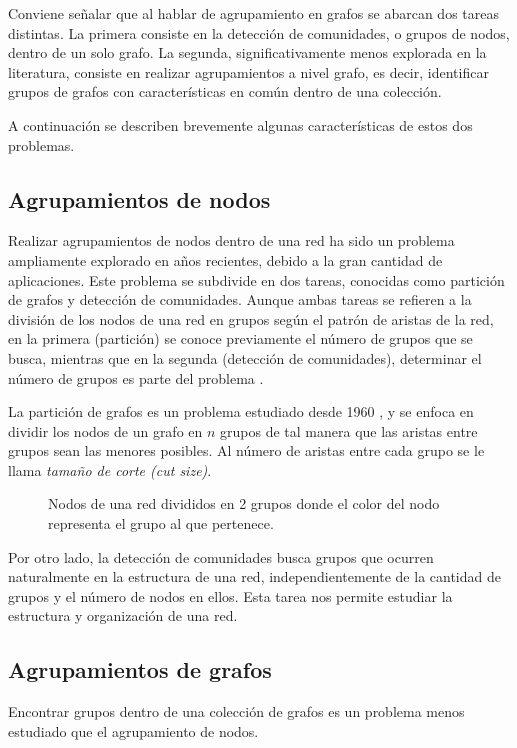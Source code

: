 Conviene señalar que al hablar de agrupamiento en grafos se abarcan dos tareas distintas. La primera consiste en la detección de comunidades, o grupos de nodos, dentro de un solo grafo. La segunda, significativamente menos explorada en la literatura, consiste en realizar agrupamientos a nivel grafo, es decir, identificar grupos de grafos con características en común dentro de una colección.  

A continuación se describen brevemente algunas características de estos dos problemas. 
\subsection{Agrupamientos de nodos}
\label{section:nodeclustering}
Realizar agrupamientos de nodos dentro de una red ha sido un problema ampliamente explorado en años recientes, debido a la gran cantidad de aplicaciones. Este problema se subdivide en dos tareas, conocidas como partición de grafos y detección de comunidades. Aunque ambas tareas se refieren a la división de los nodos de una red en grupos según el patrón de aristas de la red,  en la primera (partición) se conoce previamente el número de grupos que se busca, mientras que en la segunda (detección de comunidades), determinar el número de grupos es parte del problema \cite{newman_networks_2010}.

La partición de grafos es un problema estudiado desde 1960 \cite{newman_networks_2010}, y se enfoca en dividir los nodos de un grafo en $n$ grupos de tal manera que las aristas entre grupos sean las menores posibles. Al número de aristas entre cada grupo se le llama \emph{tamaño de corte (cut size)}. 

\begin{figure}[htbp]
   \centering
   
    \caption{Nodos de una red divididos en 2 grupos donde el color del nodo representa el grupo al que pertenece.}
    \label{fig:partition}
\end{figure}

Por otro lado, la detección de comunidades busca grupos que ocurren naturalmente en la estructura de una red, independientemente de la cantidad de grupos y el número de nodos en ellos. Esta tarea nos permite estudiar la estructura y organización de una red. 

\subsection{Agrupamientos de grafos}
Encontrar grupos dentro de una colección de grafos es un problema menos estudiado que el agrupamiento de nodos. 

